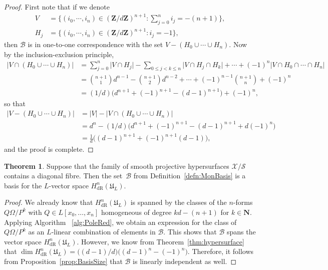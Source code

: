 \documentclass[a4paper,11pt]{article}
\numberwithin{equation}{section}
\providecommand{\abs}[1]{\lvert#1\rvert}                 %
\newcommand{\NN}{\mathbf{N}} %
\newcommand{\ZZ}{\mathbf{Z}} %
\providecommand{\HdR}{H_{\text{dR}}}    %
\providecommand{\cB}{\mathcal{B}} %
\theoremstyle{definition}
\newtheorem{thm}{Theorem}[section]
\begin{document}
\begin{proof}
First note that if we denote
\begin{align*}
V &= \{(i_0,\cdots,i_n) \in (\ZZ/d\ZZ)^{n+1} : \sum_{j=0}^n i_j = -(n+1)\}, \\
H_j &= \{(i_0,\cdots,i_n) \in (\ZZ/d\ZZ)^{n+1} : i_j = -1 \},
\end{align*}
then  $\cB$ is in one-to-one correspondence with the set $V-(H_0 \cup \cdots \cup H_n)$. 
Now by the inclusion-exclusion principle, 
\begin{align*}
\abs{V \cap (H_0 \cup \cdots \cup H_n)} &= \sum_{j=0}^n \abs{V \cap H_j} - \sum_{0 \leq j < k \leq n} \abs{V \cap H_j \cap H_k}
+ \cdots + (-1)^{n} \abs{V \cap H_0 \cap \cdots \cap H_n} \\
&= {n+1 \choose 1} d^{n-1} -{n+1 \choose 2} d^{n-2} + \cdots + (-1)^{n-1} {n+1 \choose n} + (-1)^{n} \\
&= (1/d)\bigl(d^{n+1}+(-1)^{n+1} - (d-1)^{n+1}\bigr)+(-1)^n,
\end{align*}
so that
\begin{align*}
\abs{V-(H_0 \cup \cdots \cup H_n)}&=\abs{V}-\abs{V \cap (H_0 \cup \cdots \cup H_n)} \\
&= d^n - (1/d)\bigl(d^{n+1}+(-1)^{n+1} - (d-1)^{n+1}+d (-1)^n \bigr) \\
&= \frac{1}{d} \bigl((d-1)^{n+1} + (-1)^{n+1}(d-1) \bigr),
\end{align*}
and the proof is complete.
\end{proof}

\begin{thm} \label{thm:Basis}
Suppose that the family of smooth projective hypersurfaces $\mathcal{X}/\mathcal{S}$ 
contains a diagonal fibre.  Then the set~$\cB$ from Definition~\ref{defn:MonBasis} 
is a basis for the $L$-vector space $\HdR^n(\mathfrak{U}_L)$.
\end{thm}

\begin{proof}
We already know that $\HdR^n(\mathfrak{U}_L)$ is spanned by the classes of the 
$n$-forms $Q \Omega / P^k$ with $Q \in L[x_0, \dotsc, x_n]$ homogeneous of degree 
$kd - (n+1)$ for $k \in \NN$. Applying Algorithm ~\ref{alg:PoleRed}, we obtain an 
expression for the class of $Q \Omega / P^k$ as an $L$-linear combination of 
elements in $\cB$.  This shows that $\cB$ spans the vector space 
$\HdR^n(\mathfrak{U}_L)$. However, we know from Theorem~\ref{thm:hypersurface} that 
$\dim \HdR^n(\mathfrak{U}_L) = \bigl((d-1)/d\bigr) \bigl( (d-1)^n - (-1)^n \bigr)$.  
Therefore, it follows from Proposition~\ref{prop:BasisSize} that $\cB$ is linearly 
independent as well.
\end{proof}
\end{document}
